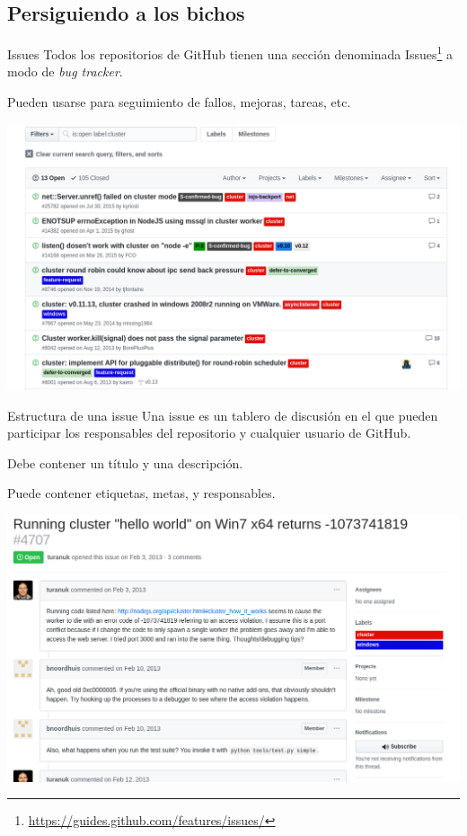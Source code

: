 \documentclass[xcolor={usenames,svgnames,dvipsnames}]{beamer}
\begin{document}
\subsection{Persiguiendo a los bichos}
\label{sec:orge2b8a67}

\begin{frame}[label={sec:org54572c5}]{Issues}
Todos los repositorios de GitHub tienen una sección denominada \guillemotleft{}Issues\guillemotright{}\footnote{\url{https://guides.github.com/features/issues/}} a modo de \emph{bug tracker}.

Pueden usarse para seguimiento de fallos, mejoras, tareas, etc.

\begin{center}
\includegraphics[width=.9\linewidth]{figs/github_issues.png}
\end{center}
\end{frame}

\begin{frame}[label={sec:org6005b67}]{Estructura de una issue}
Una issue es un tablero de discusión en el que pueden participar los responsables del repositorio y cualquier usuario de GitHub.

\alert{Debe} contener un título y una descripción.

\alert{Puede} contener etiquetas, metas, y responsables.

\begin{center}
\includegraphics[width=.9\linewidth]{figs/github_issue_example.png}
\end{center}
\end{frame}
\end{document}
